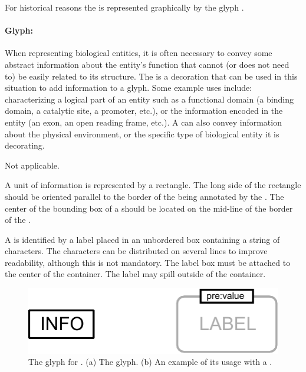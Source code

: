 For historical reasons the  is represented
graphically by the glyph .

\paragraph{Glyph: }
\label{sec:techref:unitInfo}

When representing biological entities, it is often necessary to convey
some abstract information about the entity's function that cannot (or
does not need to) be easily related to its structure.  The  is a decoration that can be used in this situation
to add information to a glyph.  Some example uses include:
characterizing a logical part of an entity such as a functional domain
(a binding domain, a catalytic site, a promoter, etc.), or the
information encoded in the entity (an exon, an open reading frame,
etc.).  A  can also convey information
about the physical environment, or the specific type of biological
entity it is decorating.

\begin{glyphDescription}

\glyphSboTerm Not applicable.

\glyphContainer A unit of information is represented by a rectangle.  The long side of the rectangle should be oriented parallel to the border of the  being annotated by the . The center of the bounding box of a  should be located on the mid-line of the border of the .

\glyphLabel A  is identified by a label placed in an unbordered box containing a string of characters.  The characters can be distributed on several lines to improve readability, although this is not mandatory.  The label box must be attached to the center of the container.  The label may spill outside of the container.


\end{glyphDescription}

\begin{figure}[htb]
  \centering
  \includegraphics[scale = 0.3]{images/unitInformation}
  \caption{The \PD glyph for . (a) The
    glyph. (b) An example of its usage with a .}
  \label{fig:techref:unitInfo}
\end{figure}


